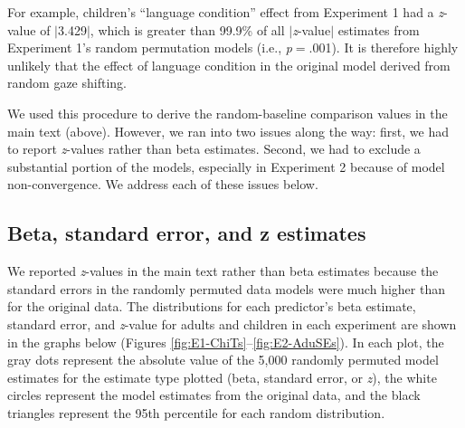 \documentclass[authoryear, 12pt]{elsarticle}
\begin{document}
For example, children's ``language condition'' effect from Experiment 1 had a \textit{z}-value of $|$3.429$|$, which is greater than 99.9\% of all $|$\textit{z}-value$|$ estimates from Experiment 1's random permutation models (i.e., \textit{p}$=$.001). It is therefore highly unlikely that the effect of language condition in the original model derived from random gaze shifting.

We used this procedure to derive the random-baseline comparison values in the main text (above). However, we ran into two issues along the way: first, we had to report \textit{z}-values rather than beta estimates. Second, we had to exclude a substantial portion of the models, especially in Experiment 2 because of model non-convergence. We address each of these issues below.

\subsection{Beta, standard error, and z estimates}
We reported \textit{z}-values in the main text rather than beta estimates because the standard errors in the randomly permuted data models were much higher than for the original data. The distributions for each predictor's beta estimate, standard error, and \textit{z}-value for adults and children in each experiment are shown in the graphs below (Figures \ref{fig:E1-ChiTs}--\ref{fig:E2-AduSEs}). In each plot, the gray dots represent the absolute value of the 5,000 randomly permuted model estimates for the estimate type plotted (beta, standard error, or \textit{z}), the white circles represent the model estimates from the original data, and the black triangles represent the 95th percentile for each random distribution.
\end{document}
